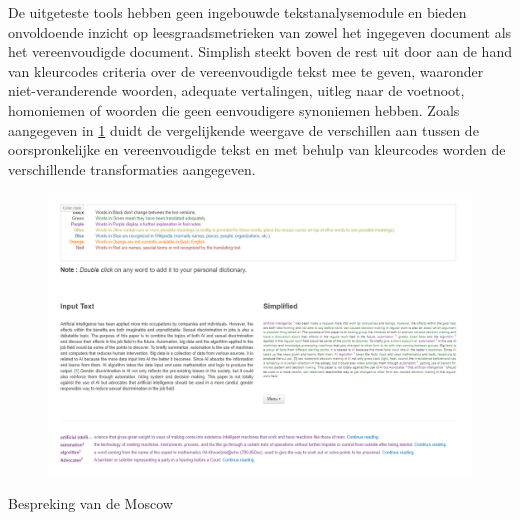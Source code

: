 \medspace

De uitgeteste tools hebben geen ingebouwde tekstanalysemodule en bieden onvoldoende inzicht op leesgraadsmetrieken van zowel het ingegeven document als het vereenvoudigde document. Simplish steekt boven de rest uit door aan de hand van kleurcodes criteria over de vereenvoudigde tekst mee te geven, waaronder niet-veranderende woorden, adequate vertalingen, uitleg naar de voetnoot, homoniemen of woorden die geen eenvoudigere synoniemen hebben. Zoals aangegeven in \ref{img:simplish-output} duidt de vergelijkende weergave de verschillen aan tussen de oorspronkelijke en vereenvoudigde tekst en met behulp van kleurcodes worden de verschillende transformaties aangegeven.

\begin{figure}[H]
	\includegraphics[width=\linewidth]{img/simplish-output.png}
	\label{img:simplish-output}
\end{figure}

Bespreking van de Moscow

